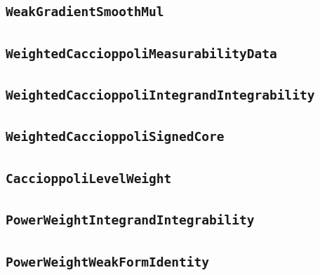 \documentclass[11pt]{amsart}
\theoremstyle{definition}
\begin{document}
\subsection{\texorpdfstring{\texttt{WeakGradientSmoothMul}}{WeakGradientSmoothMul}}\label{node:WeakGradientSmoothMul}


\subsection{\texorpdfstring{\texttt{WeightedCaccioppoliMeasurabilityData}}{WeightedCaccioppoliMeasurabilityData}}\label{node:WeightedCaccioppoliMeasurabilityData}


\subsection{\texorpdfstring{\texttt{WeightedCaccioppoliIntegrandIntegrability}}{WeightedCaccioppoliIntegrandIntegrability}}\label{node:WeightedCaccioppoliIntegrandIntegrability}


\subsection{\texorpdfstring{\texttt{WeightedCaccioppoliSignedCore}}{WeightedCaccioppoliSignedCore}}\label{node:WeightedCaccioppoliSignedCore}


\subsection{\texorpdfstring{\texttt{CaccioppoliLevelWeight}}{CaccioppoliLevelWeight}}\label{node:CaccioppoliLevelWeight}


\subsection{\texorpdfstring{\texttt{PowerWeightIntegrandIntegrability}}{PowerWeightIntegrandIntegrability}}\label{node:PowerWeightIntegrandIntegrability}


\subsection{\texorpdfstring{\texttt{PowerWeightWeakFormIdentity}}{PowerWeightWeakFormIdentity}}\label{node:PowerWeightWeakFormIdentity}

\end{document}
